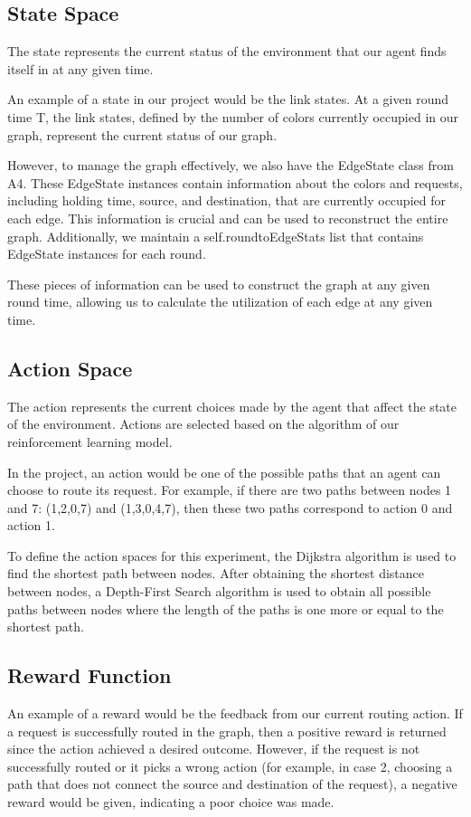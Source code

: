 \documentclass[conference]{IEEEtran}
\begin{document}
\subsection{State Space}
The state represents the current status of the environment that our agent finds itself in at any given time.

An example of a state in our project would be the link states. At a given round time 
T, the link states, defined by the number of colors currently occupied in our graph, represent the current status of our graph.

However, to manage the graph effectively, we also have the EdgeState class from A4. These EdgeState instances contain information about the colors and requests, including holding time, source, and destination, that are currently occupied for each edge. This information is crucial and can be used to reconstruct the entire graph. Additionally, we maintain a self.\textunderscore round\textunderscore to\textunderscore EdgeStats list that contains EdgeState instances for each round.

These pieces of information can be used to construct the graph at any given round time, allowing us to calculate the utilization of each edge at any given time.

\subsection{Action Space}

The action represents the current choices made by the agent that affect the state of the environment. Actions are selected based on the algorithm of our reinforcement learning model.

In the project, an action would be one of the possible paths that an agent can choose to route its request. For example, if there are two paths between nodes 1 and 7: (1,2,0,7) and (1,3,0,4,7), then these two paths correspond to action 0 and action 1.

To define the action spaces for this experiment, the Dijkstra algorithm is used to find the shortest path between nodes. After obtaining the shortest distance between nodes, a Depth-First Search algorithm is used to obtain all possible paths between nodes where the length of the paths is one more or equal to the shortest path.

\subsection{Reward Function}
An example of a reward would be the feedback from our current routing action. If a request is successfully routed in the graph, then a positive reward is returned since the action achieved a desired outcome. However, if the request is not successfully routed or it picks a wrong action (for example, in case 2, choosing a path that does not connect the source and destination of the request), a negative reward would be given, indicating a poor choice was made.
\end{document}
